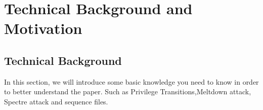 \chapter{Technical Background and Motivation}
\label{sec:state}








\section{Technical Background}
In this section, we will introduce some basic knowledge 
you need to know in order to better understand the paper. 
Such as Privilege Transitions,Meltdown attack, Spectre attack and sequence files.

